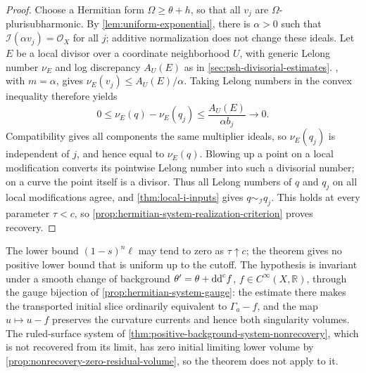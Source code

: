 \begin{proof}
Choose a Hermitian form $\Omega\geq\theta+h$, so that all $v_j$ are $\Omega$-plurisubharmonic. By \cref{lem:uniform-exponential}, there is $\alpha>0$ such that $\mathcal I(\alpha v_j)=\mathcal O_X$ for all $j$; additive normalization does not change these ideals. Let $E$ be a local divisor over a coordinate neighborhood $U$, with generic Lelong number $\nu_E$ and log discrepancy $A_U(E)$ as in \cref{sec:psh-divisorial-estimates}. , with $m=\alpha$, gives $\nu_E(v_j)\leq A_U(E)/\alpha$. Taking Lelong numbers in the convex inequality therefore yields
\[
 0\leq\nu_E(q)-\nu_E(q_j)
       \leq\frac{A_U(E)}{\alpha b_j}\longrightarrow0.
\]
Compatibility gives all components the same multiplier ideals, so $\nu_E(q_j)$ is independent of $j$, and hence equal to $\nu_E(q)$. Blowing up a point on a local modification converts its pointwise Lelong number into such a divisorial number; on a curve the point itself is a divisor. Thus all Lelong numbers of $q$ and $q_j$ on all local modifications agree, and \cref{thm:local-i-inputs} gives $q\sim_{\mathcal I}q_j$. This holds at every parameter $\tau<c$, so \cref{prop:hermitian-system-realization-criterion} proves recovery.
\end{proof}

The lower bound $(1-s)^n\ell$ may tend to zero as $\tau\uparrow c$; the theorem gives no positive lower bound that is uniform up to the cutoff. The hypothesis is invariant under a smooth change of background $\theta'=\theta+\mathrm{dd}^{\mathrm{c}} f$, $f\in C^\infty(X,\mathbb R)$, through the gauge bijection of \cref{prop:hermitian-system-gauge}: the estimate there makes the transported initial slice ordinarily equivalent to $\Gamma_a-f$, and the map $u\mapsto u-f$ preserves the curvature currents and hence both singularity volumes. The ruled-surface system of \cref{thm:positive-background-system-nonrecovery}, which is not recovered from its limit, has zero initial limiting lower volume by \cref{prop:nonrecovery-zero-residual-volume}, so the theorem does not apply to it.
